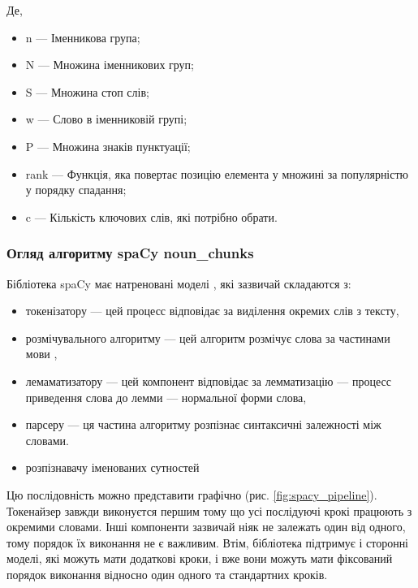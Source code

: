 \documentclass[14pt]{extarticle}
\begin{document}
  Де,
  \begin{itemize}[labelindent=\dimexpr{}\relax, leftmargin=*]
    \item n --- Іменникова група;
    \item N --- Множина іменникових груп;
    \item S --- Множина стоп слів;
    \item w --- Слово в іменниковій групі;
    \item P --- Множина знаків пунктуації;
    \item rank --- Функція,
      яка повертає позицію елемента у множині за популярністю
      у порядку спадання;
    \item c --- Кількість ключових слів, які потрібно обрати.
  \end{itemize}

  \subsubsection{Огляд алгоритму spaCy noun\_chunks}
  Бібліотека spaCy має натреновані моделі \cite{spacy_models,spacy_pipelines},
  які зазвичай складаются з:
  \begin{itemize}[labelindent=\dimexpr{}\relax, leftmargin=*]
    \item токенізатору \cite{wiki_tokenizer,spacy_tokenizer} ---
      цей процесс відповідає за виділення окремих слів з тексту,
    \item розмічувального алгоритму \cite{spacy_tagger} ---
      цей алгоритм розмічує слова за частинами мови \cite{wiki_pos_tagging},
    \item лемаматизатору \cite{spacy_lemmatizer} ---
      цей компонент відповідає за лемматизацію \cite{wiki_lemmatization} ---
      процесс приведення слова до лемми \cite{wiki_lemma} ---
      нормальної форми слова,
    \item парсеру \cite{spacy_dependency_parser} --- ця частина алгоритму розпізнає синтаксичні
    залежності між словами.
    \item розпізнавачу іменованих сутностей \cite{wiki_ner, spacy_er}
  \end{itemize}

  Цю послідовність можно представити графічно (рис. \ref{fig:spacy_pipeline}).
  Токенайзер завжди виконуєтся першим
  тому що усі послідуючі крокі працюють з окремими словами.
  Інші компоненти зазвичай ніяк не залежать один від одного,
  тому порядок їх виконання не є важливим. Втім,
  бібліотека підтримує і сторонні моделі, які можуть мати додаткові кроки,
  і вже вони можуть мати фіксований порядок виконання відносно один одного
  та стандартних кроків.
\end{document}

